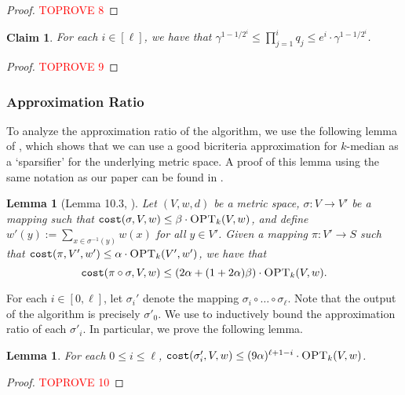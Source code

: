 \documentclass[11pt]{article}
\newcommand{\1}{\mathmybb{1}}
\newtheorem{lemma}[theorem]{Lemma}
\newtheorem{claim}[theorem]{Claim}
\newcommand{\OPT}{\textsc{OPT}}
\newcommand{\cost}{\textnormal{\texttt{cost}}}
\begin{document}
\begin{proof}\textcolor{red}{TOPROVE 8}\end{proof}

\begin{claim}\label{app:lem:prod q}
    For each $i \in [\ell]$, we have that $\gamma^{1 - 1/2^i} \leq \prod_{j=1}^i q_j \leq e^i \cdot \gamma^{1 - 1/2^i}$.
\end{claim}

\begin{proof}\textcolor{red}{TOPROVE 9}\end{proof}

\subsubsection*{Approximation Ratio}
To analyze the approximation ratio of the algorithm, we use the following lemma of \cite{focs/GuhaMMO00}, which shows that we can use a good bicriteria approximation for $k$-median as a `sparsifier' for the underlying metric space. A proof of this lemma using the same notation as our paper can be found in \cite{focs/BCLP24}.



\begin{lemma}[Lemma 10.3, \cite{focs/BCLP24}]\label{lem:bicri=sparsifier}
    Let $(V,w,d)$ be a metric space,
    $\sigma : V \longrightarrow V'$ be a mapping such that $\cost(\sigma, V, w) \leq \beta \cdot \OPT_k(V, w)$, and define $w'(y) := \sum_{x \in \sigma^{-1}(y)} w(x)$ for all $y \in V'$. Given a mapping $\pi : V' \longrightarrow S$ such that $\cost(\pi, V', w') \leq \alpha \cdot \OPT_k(V', w')$, we have that
    $$ \cost(\pi \circ \sigma, V, w) \leq (2\alpha + (1 + 2\alpha)\beta) \cdot \OPT_k(V, w). $$
\end{lemma}

For each $i \in [0, \ell]$, let $\sigma_i'$ denote the mapping $\sigma_i \circ \dots \circ \sigma_\ell$. Note that the output of the algorithm is precisely $\sigma'_0$.
We use  to inductively bound the approximation ratio of each $\sigma'_i$. In particular, we prove the following lemma.

\begin{lemma}\label{lem:apx rec}
    For each $0 \leq i \leq \ell$, $\cost (\sigma'_{i}, V, w) \leq (9\alpha)^{\ell + 1 - i} \cdot \OPT_k(V, w)$.
\end{lemma}

\begin{proof}\textcolor{red}{TOPROVE 10}\end{proof}
\end{document}
